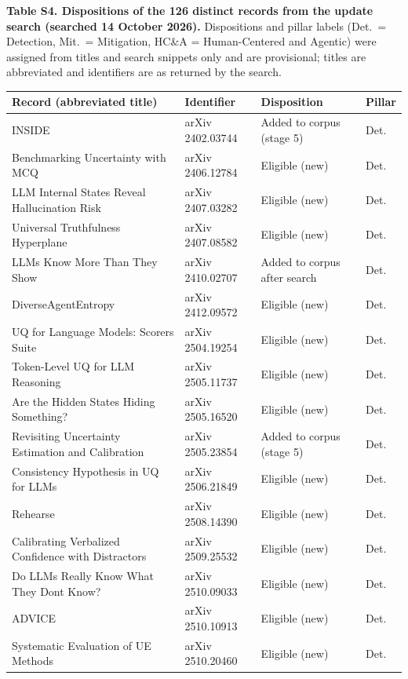 \documentclass[acmsmall]{acmart}
\begin{document}
\clearpage
\noindent\textbf{Table S4. Dispositions of the 126 distinct records from the update search (searched 14 October 2026).} Dispositions and pillar labels (Det.\ = Detection, Mit.\ = Mitigation, HC\&A = Human-Centered and Agentic) were assigned from titles and search snippets only and are provisional; titles are abbreviated and identifiers are as returned by the search.
\begin{center}
\scriptsize
\begin{longtable}{@{}p{5.6cm} p{3.6cm} p{2.4cm} p{0.9cm}@{}}
\toprule
\textbf{Record (abbreviated title)} & \textbf{Identifier} & \textbf{Disposition} & \textbf{Pillar} \\
\midrule
\endhead
INSIDE & arXiv 2402.03744 & Added to corpus (stage 5) & Det. \\
Benchmarking Uncertainty with MCQ & arXiv 2406.12784 & Eligible (new) & Det. \\
LLM Internal States Reveal Hallucination Risk & arXiv 2407.03282 & Eligible (new) & Det. \\
Universal Truthfulness Hyperplane & arXiv 2407.08582 & Eligible (new) & Det. \\
LLMs Know More Than They Show & arXiv 2410.02707 & Added to corpus after search & Det. \\
DiverseAgentEntropy & arXiv 2412.09572 & Eligible (new) & Det. \\
UQ for Language Models: Scorers Suite & arXiv 2504.19254 & Eligible (new) & Det. \\
Token-Level UQ for LLM Reasoning & arXiv 2505.11737 & Eligible (new) & Det. \\
Are the Hidden States Hiding Something? & arXiv 2505.16520 & Eligible (new) & Det. \\
Revisiting Uncertainty Estimation and Calibration & arXiv 2505.23854 & Added to corpus (stage 5) & Det. \\
Consistency Hypothesis in UQ for LLMs & arXiv 2506.21849 & Eligible (new) & Det. \\
Rehearse & arXiv 2508.14390 & Eligible (new) & Det. \\
Calibrating Verbalized Confidence with Distractors & arXiv 2509.25532 & Eligible (new) & Det. \\
Do LLMs Really Know What They Dont Know? & arXiv 2510.09033 & Eligible (new) & Det. \\
ADVICE & arXiv 2510.10913 & Eligible (new) & Det. \\
Systematic Evaluation of UE Methods & arXiv 2510.20460 & Eligible (new) & Det. \\

\end{longtable}
\end{center}
\end{document}
